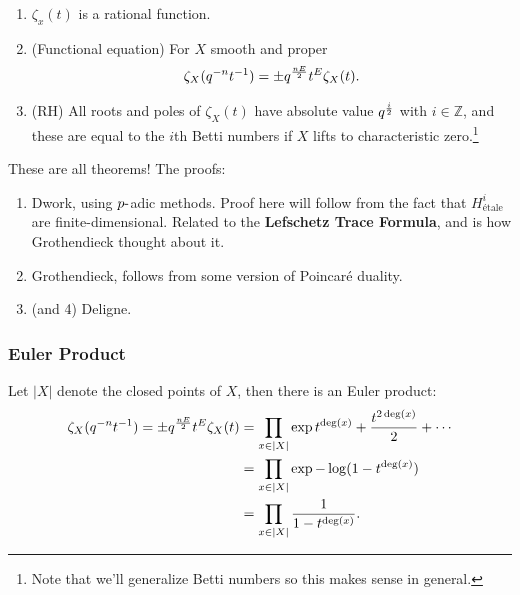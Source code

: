 \begin{theorem}

\envlist

\begin{enumerate}
\def\labelenumi{\arabic{enumi}.}
\item
  \(\zeta_x(t)\) is a rational function.
\item
  (Functional equation) For \(X\) smooth and proper
  \begin{align*}  
  \zeta_X(q^{-n} t^{-1}) = \pm q^{nE \over 2} t^E \zeta_X(t)
  .\end{align*}
\item
  (RH) All roots and poles of \(\zeta_X(t)\) have absolute value
  \(q^{i\over 2}\) with \(i\in {\mathbb{Z}}\), and these are equal to
  the \(i\)th Betti numbers if \(X\) lifts to characteristic
  zero.\footnote{Note that we'll generalize Betti numbers so this makes
    sense in general.}
\end{enumerate}

\end{theorem}

\begin{remark}

These are all theorems! The proofs:

\begin{enumerate}
\def\labelenumi{\arabic{enumi}.}
\item
  Dwork, using \(p{\hbox{-}}\)adic methods. Proof here will follow from
  the fact that \(H^i_{\text{étale} }\) are finite-dimensional. Related
  to the \textbf{Lefschetz Trace Formula}, and is how Grothendieck
  thought about it.
\item
  Grothendieck, follows from some version of Poincaré duality.
\item
  (and 4) Deligne.
\end{enumerate}

\end{remark}

\hypertarget{euler-product}{%
\subsubsection{Euler Product}\label{euler-product}}

Let \({\left\lvert {X} \right\rvert}\) denote the closed points of
\(X\), then there is an Euler product:
\begin{align*}  
\zeta_X(q^{-n} t^{-1}) = \pm q^{nE \over 2} t^E \zeta_X(t)
&= \prod_{x\in {\left\lvert {X} \right\rvert}} \exp{t^{\deg (x)} + {t^{2\deg (x)} \over 2} + \cdots} \\
&= \prod_{x\in {\left\lvert {X} \right\rvert}} \exp{-\log(1-t^{\deg(x)})} \\
&= \prod_{x\in {\left\lvert {X} \right\rvert}} {1 \over 1 - t^{\deg(x)}}
.\end{align*}

